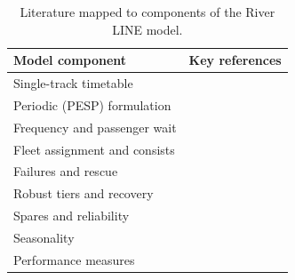 \documentclass[11pt]{article}
\begin{document}
\begin{table}[ht]
\centering\small
\begin{tabularx}{\textwidth}{@{}lX@{}}
\toprule
Model component & Key references \\
\midrule
Single-track timetable & \citet{szpigel1973optimal,higgins1996optimal,zhou2007single,caprara2002modeling,cacchiani2008column,harrod2012tutorial} \\
Periodic (PESP) formulation & \citet{serafini1989mathematical,odijk1996constraint,kroon2003variable,liebchen2008first,kroon2009new} \\
Frequency and passenger wait & \citet{ceder1984bus,schobel2012line,welding1957instability,osuna1972control,niu2015train,parbo2016passenger} \\
Fleet assignment and consists & \citet{schrijver1993minimum,alfieri2006efficient,fioole2006rolling,bunte2009overview} \\
Failures and rescue & \citet{li2007vehicle,jespersengroth2009disruption,nielsen2012rolling,cacchiani2014overview} \\
Robust tiers and recovery & \citet{liebchen2009concept,fischetti2009light,kroon2008stochastic,dure1999maximizing} \\
Spares and reliability & \citet{sherbrooke1968metric,hou2018optimization,fta2015op37,tcrp2014spare,conradie2015quantifying} \\
Seasonality & \citet{ferranti2016heat,brazil2017weather,white2023yearround} \\
Performance measures & \citet{tcrp2013tcqsm,vanoort2014incorporating,olsson2004influencing} \\
\bottomrule
\end{tabularx}
\caption{Literature mapped to components of the River LINE model.}
\label{tab:map}
\end{table}



\end{document}
